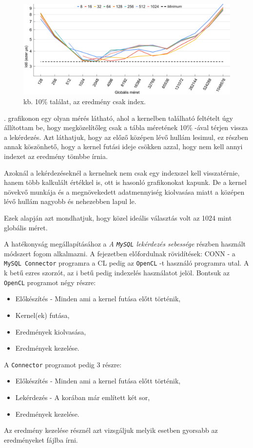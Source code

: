 \begin{figure}[h!]
\centering
\includegraphics[width=\textwidth]{images/graph/global_size_2.png}
\caption{kb. 10\% találat, az eredmény csak index.}
\label{fig:global_size_2}
\end{figure}

. grafikonon egy olyan mérés látható, ahol a kernelben található feltételt úgy állítottam be, hogy megközelítőleg csak a tábla méretének 10\% -ával térjen vissza a lekérdezés.
Azt láthatjuk, hogy az előző középen lévő hullám lesimul, ez részben annak köszönhető, hogy a kernel futási ideje csökken azzal, hogy nem kell annyi indexet az eredmény tömbbe írnia.

Azoknál a lekérdezéseknél a kernelnek nem csak egy indexszel kell visszatérnie, hanem több kalkulált értékkel is, ott is hasonló grafikonokat kapunk. De a kernel növekvő munkája és a megnövekedett adatmennyiség kiolvasása miatt a középen lévő hullám nagyobb és nehezebben lapul le.

Ezek alapján azt mondhatjuk, hogy közel ideális választás volt az 1024 mint globális méret.


A hatékonyság megállapításához a \textit{A \texttt{MySQL} lekérdezés sebessége} részben használt módszert fogom alkalmazni.
A fejezetben előfordulnak rövidítések: CONN - a \texttt{MySQL Connector} programra a CL pedig az \texttt{OpenCL} -t használó programra utal. 
A k betű ezres szorzót, az i betű pedig indexelés használatot jelöl.
\newline Bontsuk az \texttt{OpenCL} programot négy részre:
\begin{itemize}
\item Előkészítés - Minden ami a kernel futása előtt történik,
\item Kernel(ek) futása,
\item Eredmények kiolvasása,
\item Eredmények kezelése.
\end{itemize}
A \texttt{Connector} programot pedig 3 részre:
\begin{itemize}
\item Előkészítés - Minden ami a kernel futása előtt történik,
\item Lekérdezés - A korában már említett két sor,
\item Eredmények kezelése.
\end{itemize}
Az eredmény kezelése résznél azt vizsgáljuk melyik esetben gyorsabb az eredményeket fájlba írni.

